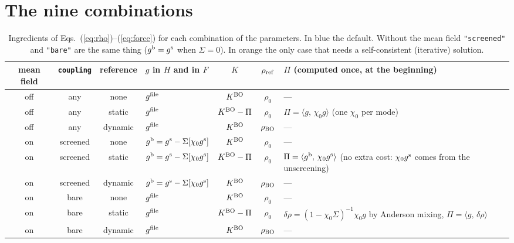\documentclass[11pt]{article}
\newcommand{\gs}{g^{\rm s}}
\newcommand{\gb}{g^{\rm b}}
\newcommand{\gf}{g^{\rm file}}
\newcommand{\KBO}{K^{\rm BO}}
\newcommand{\rBO}{\rho_{\rm BO}}
\newcommand{\inner}[2]{\langle #1,\,#2\rangle}
\begin{document}
\section{The nine combinations}\label{sec:table}
\begin{table}[h]
\centering
\small
\renewcommand{\arraystretch}{1.55}
\begin{tabularx}{\textwidth}{@{}c c c >{\raggedright\arraybackslash}p{3.3cm} c c L@{}}
\toprule
mean field & \texttt{coupling} & reference & $g$ in $H$ and in $F$ & $K$ & $\rho_{\rm ref}$ & $\Pi$ (computed once, at the beginning) \\
\midrule
off & any & none    & $\gf$ & $\KBO$ & $\rho_0$ & --- \\
off & any & static  & $\gf$ & $\KBO-\Pi$ & $\rho_0$ & $\Pi = \inner{g}{\chi_0 g}$ (one $\chi_0$ per mode) \\
off & any & dynamic & $\gf$ & $\KBO$ & $\rBO$ & --- \\
\midrule
on & screened & none    & $\gb = \gs - \Sigma[\chi_0\gs]$ & $\KBO$ & $\rho_0$ & --- \\
on & screened & static  & $\gb = \gs - \Sigma[\chi_0\gs]$ & $\KBO-\Pi$ & $\rho_0$ & $\Pi = \inner{\gb}{\chi_0\gs}$ (no extra cost: $\chi_0\gs$ comes from the unscreening) \\
on & screened & dynamic & $\gb = \gs - \Sigma[\chi_0\gs]$ & $\KBO$ & $\rBO$ & --- \\
\midrule
on & bare & none    & $\gf$ & $\KBO$ & $\rho_0$ & --- \\
on & bare & static  & $\gf$ & $\KBO-\Pi$ & $\rho_0$ & $\delta\rho = (1-\chi_0\Sigma)^{-1}\chi_0 g$ by Anderson mixing, $\Pi = \inner{g}{\delta\rho}$ \\
on & bare & dynamic & $\gf$ & $\KBO$ & $\rBO$ & --- \\
\bottomrule
\end{tabularx}
\caption{Ingredients of Eqs.~(\ref{eq:rho})--(\ref{eq:force}) for each combination of the parameters. In blue the
default. Without the mean field \texttt{"screened"} and \texttt{"bare"} are the same thing ($\gb = \gs$ when
$\Sigma = 0$). In orange the only case that needs a self-consistent (iterative) solution.}
\label{tab:all}
\end{table}
\end{document}
